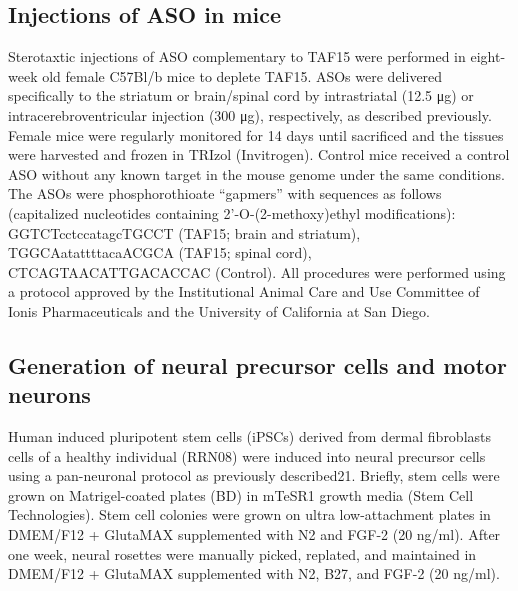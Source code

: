 \subsection{Injections of ASO in mice}
Sterotaxtic injections of ASO complementary to TAF15 were performed in eight-week old female C57Bl/b mice to deplete TAF15. ASOs were delivered specifically to the striatum or brain/spinal cord by intrastriatal (12.5 μg) or intracerebroventricular injection (300 μg), respectively, as described previously\cite{Lagier-Tourenne2012,Rigo2014}. Female mice were regularly monitored for 14 days until sacrificed and the tissues were harvested and frozen in TRIzol (Invitrogen). Control mice received a control ASO without any known target in the mouse genome under the same conditions. The ASOs were phosphorothioate “gapmers” with sequences as follows (capitalized nucleotides containing 2’-O-(2-methoxy)ethyl modifications): GGTCTcctccatagcTGCCT (TAF15; brain and striatum), TGGCAatattttacaACGCA (TAF15; spinal cord), CTCAGTAACATTGACACCAC (Control). All procedures were performed using a protocol approved by the Institutional Animal Care and Use Committee of Ionis Pharmaceuticals and the University of California at San Diego.

\subsection{Generation of neural precursor cells and motor neurons}
Human induced pluripotent stem cells (iPSCs) derived from dermal fibroblasts cells of a healthy individual (RRN08) were induced into neural precursor cells using a pan-neuronal protocol as previously described21. Briefly, stem cells were grown on Matrigel-coated plates (BD) in mTeSR1 growth media (Stem Cell Technologies). Stem cell colonies were grown on ultra low-attachment plates in DMEM/F12 + GlutaMAX supplemented with N2 and FGF-2 (20 ng/ml). After one week, neural rosettes were manually picked, replated, and maintained in DMEM/F12 + GlutaMAX supplemented with N2, B27, and FGF-2 (20 ng/ml).

